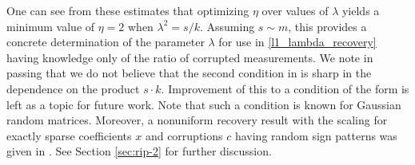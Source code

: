 One can see from these estimates that optimizing $\eta$ over values of $\lambda$ yields a minimum value of $\eta = 2$ when $\lambda^2 = s/k$. Assuming $s \sim m$, this provides a concrete determination of the parameter $\lambda$ for use in \eqref{l1_lambda_recovery} having knowledge only of the ratio of corrupted measurements.  We note in passing that we do not believe that the second condition in  is sharp in the dependence on the product $s \cdot k$.  Improvement of this to a condition of the form
is left as a topic for future work.  Note that such a condition is known for Gaussian random matrices.  Moreover, a nonuniform recovery result with the scaling  for exactly sparse coefficients $x$ and corruptions $c$ having random sign patterns was given in \cite{LiCorruptionsConstrApprox}.  See Section \ref{sec:rip-2} for further discussion.

%

